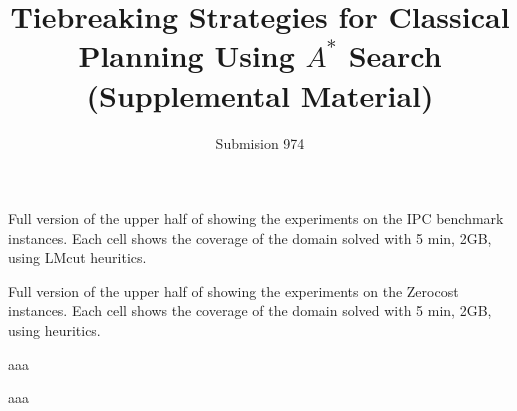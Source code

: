 \documentclass[10pt,letterpaper]{article}
\author{Submision 974}
\title{Tiebreaking Strategies for Classical Planning Using $A^*$ Search\\ (Supplemental Material)}
\begin{document}
\maketitle

\begin{table*}
 {
 \centering
 
 \caption{
 Full version of the upper half of  showing 
 the experiments on the IPC benchmark instances.
 Each cell shows the coverage of the domain solved with 5 min, 2GB,
 using LMcut heuritics.
 }
 \label{lmcut-ipc-full}
 }
\end{table*}

\begin{table*}
 {
 \centering
 
 \caption{
 Full version of the upper half of  showing 
 the experiments on the Zerocost instances.
 Each cell shows the coverage of the domain solved with 5 min, 2GB,
 using \lmcut heuritics.
 }
 \label{lmcut-zerocost-full}
 }
\end{table*}


\begin{table*}
 {
 \centering
 
 \caption{aaa}
 \label{mands-ipc-full}
 }
\end{table*}

\begin{table*}
 {
 \centering
 
 \caption{aaa}
 \label{mands-zerocost-full}
 }
\end{table*}
\end{document}
